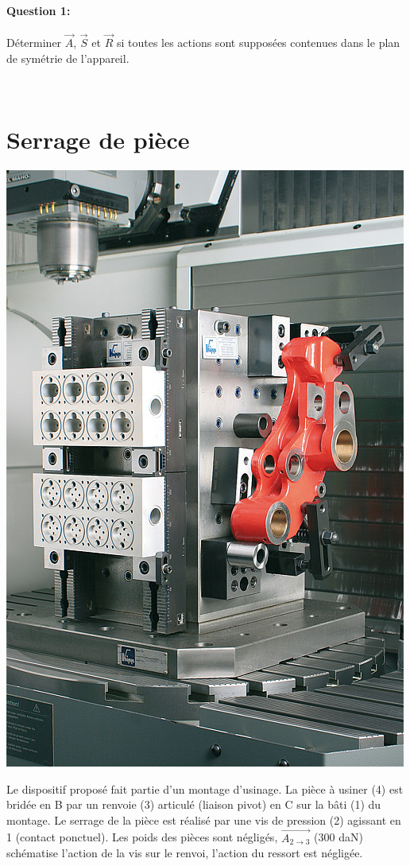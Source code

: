 \paragraph{Question 1:} Déterminer $\overrightarrow{A}$, $\overrightarrow{S}$ et $\overrightarrow{R}$ si toutes les actions sont supposées contenues dans le plan de symétrie de l'appareil.


\newpage

~\

\newpage

\section{Serrage de pièce}

\begin{minipage}{0.4\linewidth}
 \centering\includegraphics[width=0.7\linewidth]{img/KMSS.jpg}
\end{minipage}
\hfill
\begin{minipage}{0.56\linewidth}
Le dispositif proposé fait partie d'un montage d'usinage. La pièce à usiner (4) est bridée en B par un renvoie (3) articulé (liaison pivot) en C sur la bâti (1) du montage. Le serrage de la pièce est réalisé par une vis de pression (2) agissant en 1 (contact ponctuel). Les poids des pièces sont négligés, $\overrightarrow{A_{2 \rightarrow 3}}$ (300 daN) schématise l'action de la vis sur le renvoi, l'action du ressort est négligée.
\end{minipage}

